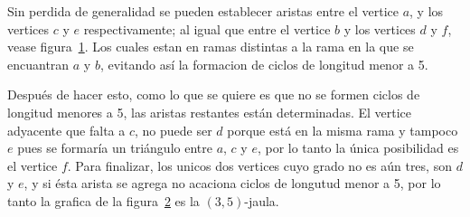 \documentclass[11pt]{book}
\theoremstyle{definition}
\begin{document}
Sin perdida de generalidad se pueden establecer aristas entre el vertice $a$, y los
vertices $c$ y $e$ respectivamente; al igual que entre el vertice $b$
y los vertices $d$ y $f$, vease figura~\ref{arbol(3,5)}. Los cuales estan en ramas
distintas a la rama en la que se encuantran $a$ y $b$, evitando así la formacion de ciclos de longitud menor a 5.


\begin{figure}[htb]
  \centering
  \caption{} \label{arbol(3,5)}
\end{figure}

Después de hacer esto, como lo que se quiere es que no se formen
ciclos de longitud menores a 5, las aristas restantes están
determinadas. El vertice adyacente que falta a $c$, no puede ser $d$
porque está en la misma rama y tampoco $e$ pues se formaría un triángulo entre $a$, $c$ y
$e$, por lo tanto la única posibilidad es el vertice $f$. Para
finalizar, los unicos dos vertices cuyo grado no es aún tres, son $d$
y $e$, y si ésta arista se agrega no acaciona ciclos de longutud menor a
5, por lo tanto la grafica de la figura~\ref{jaula(3,5)} es la $(3,5)$-jaula.

\begin{figure}[htb]
  \centering
  \caption{} \label{jaula(3,5)}
\end{figure}
\end{document}
